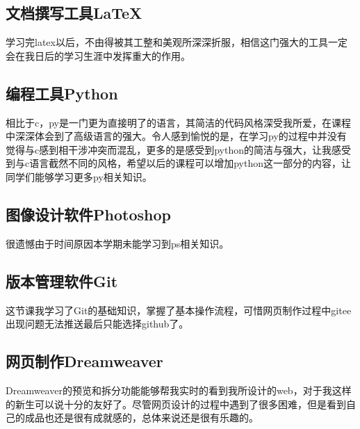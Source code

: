 \documentclass[supercite]{Experimental_Report}
\theoremstyle{definition}
\begin{document}
\subsection{文档撰写工具LaTeX}
学习完latex以后，不由得被其工整和美观所深深折服，相信这门强大的工具一定会在我日后的学习生涯中发挥重大的作用。

\subsection{编程工具Python}
相比于c，py是一门更为直接明了的语言，其简洁的代码风格深受我所爱，在课程中深深体会到了高级语言的强大。令人感到愉悦的是，在学习py的过程中并没有觉得与c感到相干涉冲突而混乱，更多的是感受到python的简洁与强大，让我感受到与c语言截然不同的风格，希望以后的课程可以增加python这一部分的内容，让同学们能够学习更多py相关知识。

\subsection{图像设计软件Photoshop}
很遗憾由于时间原因本学期未能学习到ps相关知识。

\subsection{版本管理软件Git}
这节课我学习了Git的基础知识，掌握了基本操作流程，可惜网页制作过程中gitee出现问题无法推送最后只能选择github了。

\subsection{网页制作Dreamweaver}
Dreamweaver的预览和拆分功能能够帮我实时的看到我所设计的web，对于我这样的新生可以说十分的友好了。尽管网页设计的过程中遇到了很多困难，但是看到自己的成品也还是很有成就感的，总体来说还是很有乐趣的。

	
\end{document}
